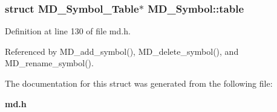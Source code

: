 \subsubsection{\setlength{\rightskip}{0pt plus 5cm}struct \bf{MD\_\-Symbol\_\-Table}$\ast$ \bf{MD\_\-Symbol::table}}\label{structMD__Symbol_e878907190cd51aa46a0659b6df0f516}




Definition at line 130 of file md.h.

Referenced by MD\_\-add\_\-symbol(), MD\_\-delete\_\-symbol(), and MD\_\-rename\_\-symbol().

The documentation for this struct was generated from the following file:\begin{CompactItemize}
\item 
\bf{md.h}\end{CompactItemize}
